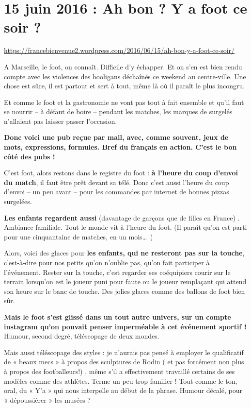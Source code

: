 \documentclass[11pt, french]{report}
\begin{document}
\chapter{15 juin 2016 : Ah bon ? Y a foot ce soir ?}

\url{https://francebienvenue2.wordpress.com/2016/06/15/ah-bon-y-a-foot-ce-soir/}

\vfill

A Marseille, le foot, on connaît. Difficile d’y échapper. Et on s’en est bien
rendu compte avec les violences des hooligans déchaînés ce weekend au centre-ville.
Une chose est sûre, il est partout et sert à tout, même là où il paraît le plus
incongru.

Et comme le foot et la gastronomie ne vont pas tout à fait ensemble et qu’il faut
se nourrir – à défaut de boire – pendant les matches, les marques de surgelés
n’allaient pas laisser passer l’occasion.

\textbf{Donc voici une pub reçue par mail, avec, comme souvent, jeux de mots, expressions,
  formules. Bref du français en action. C’est le bon côté des pubs !}

C’est foot, alors restons dans le registre du foot : \textbf{à l’heure du coup d’envoi du
  match}, il faut être prêt devant sa télé. Donc c’est aussi l’heure du coup
d’envoi – un peu avant – pour les commandes par internet de bonnes pizzas
surgelées.

\textbf{Les enfants regardent aussi} (davantage de garçons que de filles en France) .
Ambiance familiale. Tout le monde vit à l’heure du foot. (Il paraît qu’on est
parti pour une cinquantaine de matches, en un mois\ldots\ )

Alors, voici des glaces pour \textbf{les enfants, qui ne resteront pas sur la touche},
c’est-à-dire pour nos petits qu’on n’oublie pas, qu’on fait participer à
l’événement. Rester sur la touche, c’est regarder ses coéquipiers courir sur le
terrain lorsqu’on est le joueur puni pour faute ou le joueur remplaçant qui attend
son heure sur le banc de touche. Des jolies glaces comme des ballons de foot bien
sûr.

\textbf{Mais le foot s’est glissé dans un tout autre univers, sur un compte instagram
  qu’on pouvait penser imperméable à cet événement sportif !} Humour, second degré,
téléscopage de deux mondes.

Mais aussi téléscopage des styles : je n’aurais pas pensé à employer le
qualificatif de « beaux mecs » à propos des sculptures de Rodin ( et pas forcément
non plus à propos des footballeurs!) , même s’il a effectivement travaillé
certains de ses modèles comme des athlètes. Terme un peu trop familier ! Tout comme
le ton, oral, du « Y’a » qui nous interpelle au début de la phrase. Humour décalé,
pour « dépoussiérer » les musées ?
\end{document}
